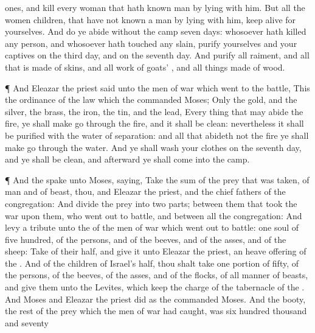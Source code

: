 {ones, and
kill every
woman that hath
known
man by
lying with
him.
But all the
women
children, that have not
known a
man by
lying with him, keep
alive for yourselves.
And do ye
abide
without the
camp
seven
days: whosoever hath
killed any
person, and whosoever hath
touched any
slain,
purify
{} yourselves and your
captives on the
third
day, and on the
seventh
day.
And
purify all
{}
raiment, and all that is
made of
skins, and all
work of
goats’
{}, and all things
made of
wood.
\par }{\PP {}¶ And
Eleazar the
priest
said unto the
men of
war which
went to the
battle, This
{} the
ordinance of the
law which the
{}
commanded
Moses;
Only the
gold, and the
silver, the
brass, the
iron, the
tin, and the
lead,
Every
thing that may
abide the
fire, ye shall make
{} go
through the
fire, and it shall be
clean: nevertheless it shall be
purified with the
water of
separation: and all that
abideth not the
fire ye shall make go
through the
water.
And ye shall
wash your
clothes on the
seventh
day, and ye shall be
clean, and
afterward ye shall
come into the
camp.
\par }{\PP {}¶ And the
{}
spake unto
Moses,
saying,
Take the
sum of the
prey that was
taken,
{} of
man and of
beast, thou, and
Eleazar the
priest, and the
chief
fathers of the
congregation:
And
divide the
prey into two
parts; between them that
took the
war upon them, who went
out to
battle, and between all the
congregation:
And
levy a
tribute unto the
{} of the
men of
war which went
out to
battle:
one
soul of
five
hundred,
{} of the
persons, and of the
beeves, and of the
asses, and of the
sheep:
Take
{} of their
half, and
give it unto
Eleazar the
priest,
{} an heave
offering of the
{}.
And of the
children of
Israel’s
half, thou shalt
take
one
portion of
fifty, of the
persons, of the
beeves, of the
asses, and of the
flocks, of all manner of
beasts, and
give them unto the
Levites, which
keep the
charge of the
tabernacle of the
{}.
And
Moses and
Eleazar the
priest
did as the
{}
commanded
Moses.
And the
booty,
{} the
rest of the
prey which the men
of
war had
caught, was
six
hundred
thousand and
seventy
}
